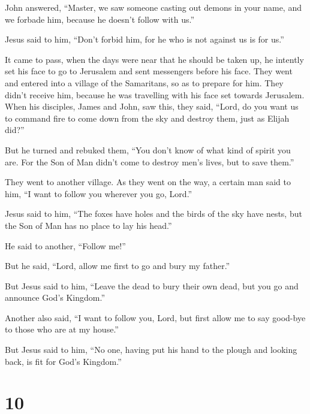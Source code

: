  John answered, ``Master, we saw someone casting out demons
in your name, and we forbade him, because he doesn't follow with us.''

 Jesus said to him, ``Don't forbid him, for he who is not
against us is for us.''

 It came to pass, when the days were near that he should be
taken up, he intently set his face to go to Jerusalem  and
sent messengers before his face. They went and entered into a village of
the Samaritans, so as to prepare for him.  They didn't
receive him, because he was travelling with his face set towards
Jerusalem.  When his disciples, James and John, saw this,
they said, ``Lord, do you want us to command fire to come down from the
sky and destroy them, just as Elijah did?''

 But he turned and rebuked them, ``You don't know of what
kind of spirit you are.  For the Son of Man didn't come to
destroy men's lives, but to save them.''

They went to another village.  As they went on the way, a
certain man said to him, ``I want to follow you wherever you go, Lord.''

 Jesus said to him, ``The foxes have holes and the birds of
the sky have nests, but the Son of Man has no place to lay his head.''

 He said to another, ``Follow me!''

But he said, ``Lord, allow me first to go and bury my father.''

 But Jesus said to him, ``Leave the dead to bury their own
dead, but you go and announce God's Kingdom.''

 Another also said, ``I want to follow you, Lord, but first
allow me to say good-bye to those who are at my house.''

 But Jesus said to him, ``No one, having put his hand to
the plough and looking back, is fit for God's Kingdom.''

\hypertarget{section-9}{%
\section{10}\label{section-9}}

